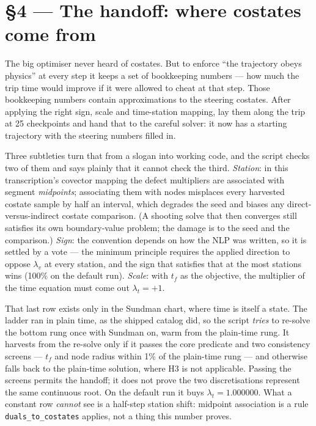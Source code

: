 \documentclass[11pt]{article}
\newcommand{\lv}{\lambda_v}\newcommand{\lr}{\lambda_r}\newcommand{\lm}{\lambda_m}
\newcommand{\tf}{t_f}\newcommand{\R}{\mathbb{R}}
\newcommand{\file}[1]{\texttt{#1}}
\begin{document}
\section{\S4 --- The handoff: where costates come from}\label{sec:handoff}

\begin{eli}
The big optimiser never heard of costates. But to enforce ``the trajectory
obeys physics'' at every step it keeps a set of bookkeeping numbers --- how
much the trip time would improve if it were allowed to cheat at that step.
Those bookkeeping numbers contain approximations to the steering costates.
After applying the right sign, scale and time-station mapping, lay them
along the trip at 25 checkpoints and hand that to the careful solver: it
now has a starting trajectory with the steering numbers filled in.
\end{eli}

\begin{intu}
Three subtleties turn that from a slogan into working code, and the script
checks two of them and says plainly that it cannot check the third.
\emph{Station}: in this transcription's covector mapping the defect
multipliers are associated with segment \emph{midpoints}; associating them
with nodes misplaces every harvested costate sample by half an interval,
which degrades the seed and biases any direct-versus-indirect costate
comparison. (A shooting solve that then converges still satisfies its own
boundary-value problem; the damage is to the seed and the comparison.)
\emph{Sign}: the convention depends on how the NLP was written, so it is
settled by a vote --- the minimum principle requires the applied direction to
oppose $\lv$ at every station, and the sign that satisfies that at the most
stations wins (100\% on the default run). \emph{Scale}: with $\tf$ as the
objective, the multiplier of the time equation must come out $\lambda_t=+1$.

That last row exists only in the Sundman chart, where time is itself a
state. The ladder ran in plain time, as the shipped catalog did, so the
script \emph{tries} to re-solve the bottom rung once with Sundman on, warm
from the plain-time rung. It harvests from the re-solve only if it passes
the core predicate and two consistency screens --- $\tf$ and node radius
within 1\% of the plain-time rung --- and otherwise falls back to the
plain-time solution, where H3 is not applicable. Passing the screens
permits the handoff; it does not prove the two discretisations represent
the same continuous root. On the default run it buys $\lambda_t=1.000000$.
What a constant row \emph{cannot} see is a half-step station shift:
midpoint association is a rule \file{duals\_to\_costates} applies, not a
thing this number proves.
\end{intu}
\end{document}
